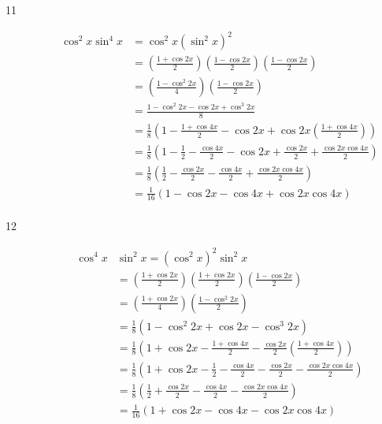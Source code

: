 \documentclass{exam}
\begin{document}
\begin{description}
      \item[11]
        \begin{align*}
          \cos^2 x \sin^4 x & = \cos^2 x \left( \sin^2 x \right)^2 \\
                            & = \left( \frac{1 + \cos 2x}{2} \right) \left( \frac{1 - \cos 2x}{2} \right) \left( \frac{1 - \cos 2x}{2} \right) \\
                            & = \left( \frac{1 - \cos^2 2x}{4} \right) \left( \frac{1 - \cos 2x}{2} \right) \\
                            & = \frac{1 - \cos^2 2x - \cos 2x + \cos^3 2x}{8} \\
                            & = \frac{1}{8} \left( 1 - \frac{1 + \cos 4x}{2} - \cos 2x + \cos 2x \left( \frac{1 + \cos 4x}{2} \right) \right) \\
                            & = \frac{1}{8} \left( 1 - \frac{1}{2} - \frac{\cos 4x}{2} - \cos 2x + \frac{\cos 2x}{2} + \frac{\cos 2x \cos 4x}{2} \right) \\
                            & = \frac{1}{8} \left( \frac{1}{2} - \frac{\cos 2x}{2} - \frac{\cos 4x}{2} + \frac{\cos 2x \cos 4x}{2} \right) \\
                            & = \boxed{ \frac{1}{16} ( 1 - \cos 2x - \cos 4x + \cos 2x \cos 4x ) } \\
        \end{align*}

      \item[12]
        \begin{align*}
          \cos^4 x & \sin^2 x = \left( \cos^2 x \right)^2 \sin^2 x \\
                   & = \left( \frac{1 + \cos 2x}{2} \right) \left( \frac{1 + \cos 2x}{2} \right) \left( \frac{1 - \cos 2x}{2} \right) \\
                   & = \left( \frac{1 + \cos 2x}{4} \right) \left( \frac{1 - \cos^2 2x}{2} \right) \\
                   & = \frac{1}{8} \left( 1 - \cos^2 2x + \cos 2x - \cos^3 2x \right) \\
                   & = \frac{1}{8} \left( 1 + \cos 2x - \frac{1 + \cos 4x}{2}  - \frac{\cos 2x}{2} \left( \frac{1 + \cos 4x}{2} \right) \right) \\
                   & = \frac{1}{8} \left( 1 + \cos 2x - \frac{1}{2}  - \frac{\cos 4x}{2} - \frac{\cos 2x}{2} - \frac{\cos 2x \cos 4x}{2} \right) \\
                   & = \frac{1}{8} \left( \frac{1}{2} + \frac{\cos 2x}{2} - \frac{\cos 4x}{2}  - \frac{\cos 2x \cos 4x}{2} \right) \\
                   & = \boxed{ \frac{1}{16} \left( 1 + \cos 2x - \cos 4x  - \cos 2x \cos 4x \right) } \\
        \end{align*}


\end{description}
\end{document}
